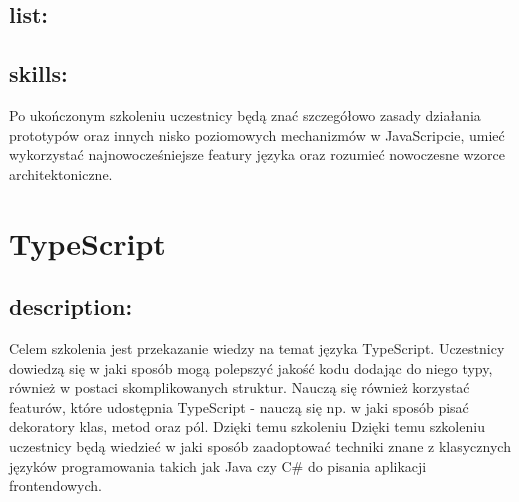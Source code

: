 \documentclass{article}[10pt]
\begin{document}
	\subsection*{list:}
\begin{adjustwidth}{1.5cm}{}
	\begin{itemize}



























	\end{itemize}
\end{adjustwidth}

	\subsection*{skills:}
\begin{adjustwidth}{2cm}{}
	
Po ukończonym szkoleniu uczestnicy będą znać szczegółowo zasady działania prototypów oraz innych nisko poziomowych mechanizmów w JavaScripcie, umieć wykorzystać najnowocześniejsze featury języka oraz rozumieć nowoczesne wzorce architektoniczne.

\end{adjustwidth}

\newpage


    
	\section{TypeScript}

	\subsection*{description:}
	\begin{adjustwidth}{2cm}{}
		
Celem szkolenia jest przekazanie wiedzy na temat języka TypeScript. Uczestnicy dowiedzą się w jaki sposób mogą polepszyć jakość kodu dodając do niego typy, również w postaci skomplikowanych struktur. Nauczą się również korzystać featurów, które udostępnia TypeScript - nauczą się np. w jaki sposób pisać dekoratory klas, metod oraz pól. Dzięki temu szkoleniu Dzięki temu szkoleniu uczestnicy będą wiedzieć w jaki sposób zaadoptować techniki znane z klasycznych języków programowania takich jak Java czy C# do pisania aplikacji frontendowych.

	\end{adjustwidth}
\end{document}
